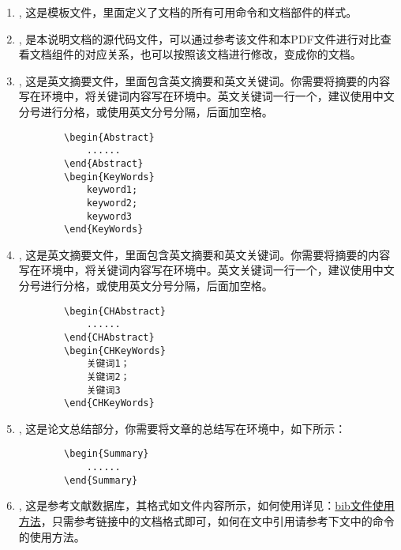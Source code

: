\documentclass{nitthesis}
\begin{document}
\begin{enumerate}
    \item {}, 这是模板文件，里面定义了文档的所有可用命令和文档部件的样式。
    \item {}, 是本说明文档的源代码文件，可以通过参考该文件和本PDF文件进行对比查看文档组件的对应关系，也可以按照该文档进行修改，变成你的文档。
    \item {}, 这是英文摘要文件，里面包含英文摘要和英文关键词。你需要将摘要的内容写在环境中，将关键词内容写在环境中。英文关键词一行一个，建议使用中文分号进行分格，或使用英文分号分隔，后面加空格。
    \begin{lstlisting}
        \begin{Abstract}
            ......
        \end{Abstract}
        \begin{KeyWords}
            keyword1; 
            keyword2; 
            keyword3 
        \end{KeyWords}
    \end{lstlisting}

    \item {}, 这是英文摘要文件，里面包含英文摘要和英文关键词。你需要将摘要的内容写在环境中，将关键词内容写在环境中。英文关键词一行一个，建议使用中文分号进行分格，或使用英文分号分隔，后面加空格。
    \begin{lstlisting}
        \begin{CHAbstract}
            ......
        \end{CHAbstract}
        \begin{CHKeyWords}
            关键词1；
            关键词2；
            关键词3 
        \end{CHKeyWords}
    \end{lstlisting}

    \item {}, 这是论文总结部分，你需要将文章的总结写在环境中，如下所示：
    \begin{lstlisting}
        \begin{Summary}
            ......
        \end{Summary}
    \end{lstlisting}

    \item {}, 这是参考文献数据库，其格式如文件内容所示，如何使用详见：\href{https://blog.csdn.net/tmylzq187/article/details/51355261}{bib文件使用方法}，只需参考链接中的文档格式即可，如何在文中引用请参考下文中的命令的使用方法。


\end{enumerate}
\end{document}
